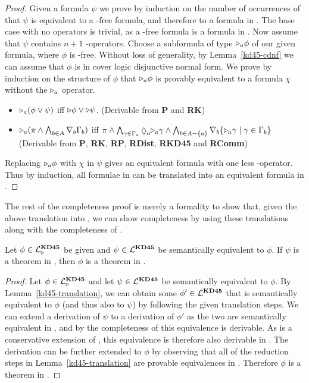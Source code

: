 \begin{proof}
Given a formula $\psi$ we prove by induction on the number of occurrences of
\somerefs{} that $\psi$ is equivalent to a \somerefs-free formula, and
therefore to a formula in \logicKD{}. The base case with no \somerefs operators
is trivial, as a \somerefs-free formula is a formula in \logicKD{}. Now assume
that $\psi$ contains $n + 1$ \somerefs-operators. Choose a subformula of type
${\mathopen{\triangleright}}_a \phi$ of our given formula, where $\phi$ is \somerefs-free. Without
loss of generality, by Lemma~\ref{kd45-cdnf} we can assume that $\phi$ is in
cover logic disjunctive normal form.  We prove by induction on the structure of
$\phi$ that ${\mathopen{\triangleright}}_a \phi$ is provably equivalent to a formula $\chi$ without
the ${\mathopen{\triangleright}}_a$ operator.

\begin{itemize}
\item ${\mathopen{\triangleright}}_a (\phi \lor \psi)$ iff ${\mathopen{\triangleright}} \phi \lor {\ensuremath{\mathopen{\triangleright}}} \psi$.
(Derivable from {\bf P} and {\bf RK})
\item ${\mathopen{\triangleright}}_a (\pi \land \bigwedge_{b \in A} \nabla_b \Gamma_b)$ iff
$\pi \land \bigwedge_{\gamma \in \Gamma_a} \suspects_a \somerefs_a \gamma \land
\bigwedge_{b \in A - \{a\}} \covers_b \{\somerefs_a \gamma \mid \gamma \in
\Gamma_b\}$ (Derivable from {\bf P}, {\bf RK}, {\bf RP}, {\bf RDist}, {\bf
RKD45} and {\bf RComm})
\end{itemize}

Replacing ${\mathopen{\triangleright}}_a \phi$ with $\chi$ in $\psi$ gives an equivalent formula
with one less \somerefs-operator. Thus by induction, all formulae in
\logicKDF{} can be translated into an equivalent formula in
\logicKD{}.
\end{proof}

The rest of the completeness proof is merely a formality to show that, given the
above translation into \logicKD{}, we can show completeness by using these
translations along with the completeness of \logicKD{}.

\begin{corollary}\label{kd45-derivable}
Let $\phi \in \mathcal{L}^{\mathbf{KD45}}_{\mathopen{\triangleright}}$ be given and $\psi \in \mathcal{L}^{\mathbf{KD45}}$ be semantically
equivalent to $\phi$.  If $\psi$ is a theorem in \logicKD{}, then $\phi$ is a
theorem in \axiomKDF{}.
\end{corollary}

\begin{proof}
Let $\phi \in \mathcal{L}^{\mathbf{KD45}}_{\mathopen{\triangleright}}$ and let $\psi \in \mathcal{L}^{\mathbf{KD45}}$ be semantically equivalent to
$\phi$. By Lemma~\ref{kd45-translation}, we can obtain some $\phi' \in \mathcal{L}^{\mathbf{KD45}}$
that is semantically equivalent to $\phi$ (and thus also to $\psi$) by following
the given translation steps. We can extend a derivation of $\psi$ to a
derivation of $\phi'$ as the two are semantically equivalent in \logicKD{}, and by
the completeness of \logicKD{} this equivalence is derivable. As \axiomKDF{} is a
conservative extension of \logicKD{}, this equivalence is therefore also derivable
in \axiomKDF{}. The derivation can be further extended to $\phi$ by observing that all
of the reduction steps in Lemma~\ref{kd45-translation} are provable equivalences
in \axiomKDF{}. Therefore $\phi$ is a theorem in \axiomKDF{}.
\end{proof}

